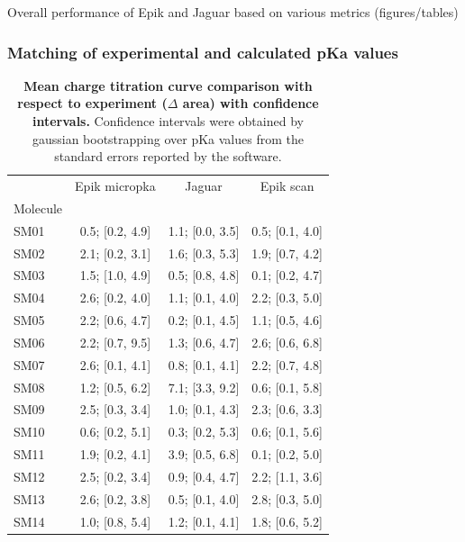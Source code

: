 \documentclass[9pt,lineno,final]{elife}
\begin{document}
Overall performance of Epik and Jaguar based on various metrics (figures/tables)
\subsubsection {Matching of experimental and calculated pKa values}




%

\begin{table}[H]
\centering
 \caption{{\bf Mean charge titration curve comparison with respect to experiment ($\Delta$ area) with confidence intervals.} Confidence intervals were obtained by gaussian bootstrapping over pKa values from the standard errors reported by the software.}\label{tab:titrationcurves}
 \begin{tabular}{lccc}
\toprule
 &    Epik micropka &           Jaguar &        Epik scan \\
Molecule &                  &                  &                  \\
\midrule
SM01     &  0.5; [0.2, 4.9] &  1.1; [0.0, 3.5] &  0.5; [0.1, 4.0] \\
SM02     &  2.1; [0.2, 3.1] &  1.6; [0.3, 5.3] &  1.9; [0.7, 4.2] \\
SM03     &  1.5; [1.0, 4.9] &  0.5; [0.8, 4.8] &  0.1; [0.2, 4.7] \\
SM04     &  2.6; [0.2, 4.0] &  1.1; [0.1, 4.0] &  2.2; [0.3, 5.0] \\
SM05     &  2.2; [0.6, 4.7] &  0.2; [0.1, 4.5] &  1.1; [0.5, 4.6] \\
SM06     &  2.2; [0.7, 9.5] &  1.3; [0.6, 4.7] &  2.6; [0.6, 6.8] \\
SM07     &  2.6; [0.1, 4.1] &  0.8; [0.1, 4.1] &  2.2; [0.7, 4.8] \\
SM08     &  1.2; [0.5, 6.2] &  7.1; [3.3, 9.2] &  0.6; [0.1, 5.8] \\
SM09     &  2.5; [0.3, 3.4] &  1.0; [0.1, 4.3] &  2.3; [0.6, 3.3] \\
SM10     &  0.6; [0.2, 5.1] &  0.3; [0.2, 5.3] &  0.6; [0.1, 5.6] \\
SM11     &  1.9; [0.2, 4.1] &  3.9; [0.5, 6.8] &  0.1; [0.2, 5.0] \\
SM12     &  2.5; [0.2, 3.4] &  0.9; [0.4, 4.7] &  2.2; [1.1, 3.6] \\
SM13     &  2.6; [0.2, 3.8] &  0.5; [0.1, 4.0] &  2.8; [0.3, 5.0] \\
SM14     &  1.0; [0.8, 5.4] &  1.2; [0.1, 4.1] &  1.8; [0.6, 5.2] \\

\end{tabular}
\end{table}
\end{document}
